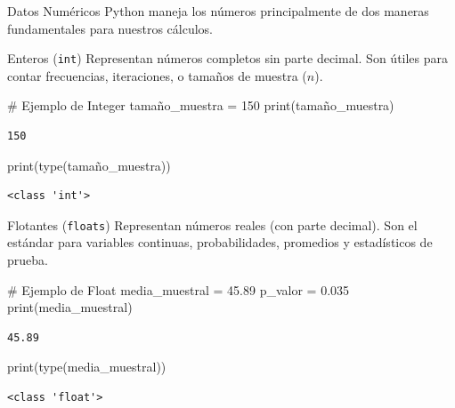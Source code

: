 \documentclass[
  ignorenonframetext,
  aspectratio=169,
  spanish,
]{beamer}
\newenvironment{Shaded}{\begin{snugshade}}{\end{snugshade}}
\newcommand{\BuiltInTok}[1]{\textcolor[rgb]{0.00,0.23,0.31}{#1}}
\newcommand{\CommentTok}[1]{\textcolor[rgb]{0.37,0.37,0.37}{#1}}
\newcommand{\DecValTok}[1]{\textcolor[rgb]{0.68,0.00,0.00}{#1}}
\newcommand{\FloatTok}[1]{\textcolor[rgb]{0.68,0.00,0.00}{#1}}
\newcommand{\NormalTok}[1]{\textcolor[rgb]{0.00,0.23,0.31}{#1}}
\newcommand{\OperatorTok}[1]{\textcolor[rgb]{0.37,0.37,0.37}{#1}}
\begin{document}
\begin{frame}{Datos Numéricos}
Python maneja los números principalmente de dos maneras fundamentales
para nuestros cálculos.
\end{frame}

\begin{frame}[fragile]{Enteros (\texttt{int})}
\label{enteros-int}
Representan números completos sin parte decimal. Son útiles para contar
frecuencias, iteraciones, o tamaños de muestra (\(n\)).

\begin{Shaded}
\begin{Highlighting}[]
\CommentTok{\# Ejemplo de Integer}
\NormalTok{tamaño\_muestra }\OperatorTok{=} \DecValTok{150}
\BuiltInTok{print}\NormalTok{(tamaño\_muestra)}
\end{Highlighting}
\end{Shaded}

\begin{verbatim}
150
\end{verbatim}

\begin{Shaded}
\begin{Highlighting}[]
\BuiltInTok{print}\NormalTok{(}\BuiltInTok{type}\NormalTok{(tamaño\_muestra))}
\end{Highlighting}
\end{Shaded}

\begin{verbatim}
<class 'int'>
\end{verbatim}
\end{frame}

\begin{frame}[fragile]{Flotantes (\texttt{floats})}
\label{flotantes-floats}
Representan números reales (con parte decimal). Son el estándar para
variables continuas, probabilidades, promedios y estadísticos de prueba.

\begin{Shaded}
\begin{Highlighting}[]
\CommentTok{\# Ejemplo de Float}
\NormalTok{media\_muestral }\OperatorTok{=} \FloatTok{45.89}
\NormalTok{p\_valor }\OperatorTok{=} \FloatTok{0.035}
\BuiltInTok{print}\NormalTok{(media\_muestral)}
\end{Highlighting}
\end{Shaded}

\begin{verbatim}
45.89
\end{verbatim}

\begin{Shaded}
\begin{Highlighting}[]
\BuiltInTok{print}\NormalTok{(}\BuiltInTok{type}\NormalTok{(media\_muestral))}
\end{Highlighting}
\end{Shaded}

\begin{verbatim}
<class 'float'>
\end{verbatim}
\end{frame}
\end{document}
